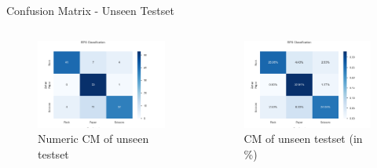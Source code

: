 \documentclass[aspectratio=169]{beamer}
\begin{document}
{	\begin{frame}{Confusion Matrix - Unseen Testset}
		\begin{columns}
			\begin{column}{.5\textwidth}
				\begin{figure}
					\centering
					\includegraphics[width=1\textwidth]{img/CFM_final_test_numeric.png}
					\caption{Numeric CM of unseen testset}
				\end{figure}      
			\end{column}
			\begin{column}{.5\textwidth}
				\begin{figure}
					\centering
					\includegraphics[width=1\textwidth]{img/CFM_final_test_percent.png}
					\caption{CM of unseen testset (in \%)}
				\end{figure}      
			\end{column} 
		\end{columns}
	\end{frame}

}
\end{document}
